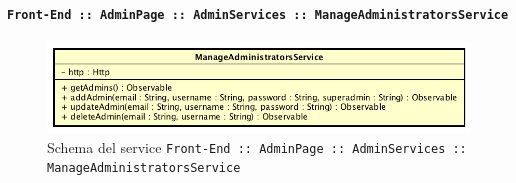 \documentclass[../DefinizioneDiProdotto_v3.0.0.tex]{subfiles}
\begin{document}
				\paragraph{\texttt{Front-End :: AdminPage :: AdminServices :: ManageAdministratorsService}}
				\acapo
				\begin{figure}[!h]
					\centering
					\includegraphics[scale=0.7]{Architettura/Front-End/AdminPage/AdminServices/ManageAdministratorsService.png}
					\caption{Schema del service \texttt{Front-End :: AdminPage :: AdminServices :: ManageAdministratorsService}}
				\end{figure}
\end{document}
